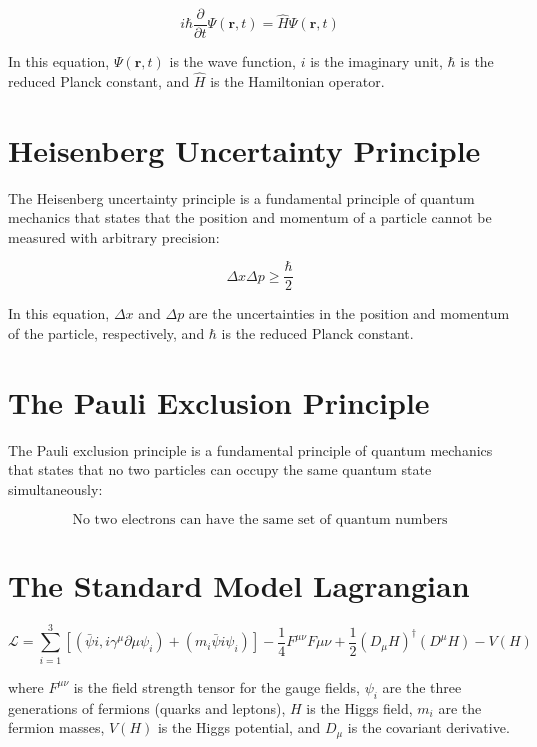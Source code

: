     $$i\hbar\frac{\partial}{\partial t} \Psi(\mathbf{r}, t) = \hat{H} \Psi(\mathbf{r}, t)$$

    In this equation, $\Psi(\mathbf{r}, t)$ is the wave function, $i$ is the imaginary unit, 
    $\hbar$ is the reduced Planck constant, and $\hat{H}$ is the Hamiltonian operator.

    \section*{Heisenberg Uncertainty Principle}

    The Heisenberg uncertainty principle is a fundamental principle of quantum mechanics 
    that states that the position and momentum of a particle cannot be measured with arbitrary precision:

    $$\Delta x \Delta p \ge \frac{\hbar}{2}$$

    In this equation, $\Delta x$ and $\Delta p$ are the uncertainties in the position 
    and momentum of the particle, respectively, and $\hbar$ is the reduced Planck constant.

    \section*{The Pauli Exclusion Principle}

    The Pauli exclusion principle is a fundamental principle of quantum mechanics 
    that states that no two particles can occupy the same quantum state simultaneously:

    $$\text{No two electrons can have the same set of quantum numbers}$$

    \section*{The Standard Model Lagrangian}

    $$\mathcal{L} = \sum_{i=1}^3\left[\left(\bar{\psi}i, i\gamma^{\mu}\partial{\mu}\psi_i\right) + 
    \left(m_i \bar{\psi}i\psi_i\right)\right] - \frac{1}{4}F^{\mu\nu}F{\mu\nu} + 
    \frac{1}{2}\left(D_{\mu}H\right)^{\dagger}\left(D^{\mu}H\right) - V\left(H\right)$$

    where $F^{\mu\nu}$ is the field strength tensor for the gauge fields, $\psi_i$ are the 
    three generations of fermions (quarks and leptons), $H$ is the Higgs field, $m_i$ are the fermion masses, 
    $V\left(H\right)$ is the Higgs potential, and $D_{\mu}$ is the covariant derivative.




